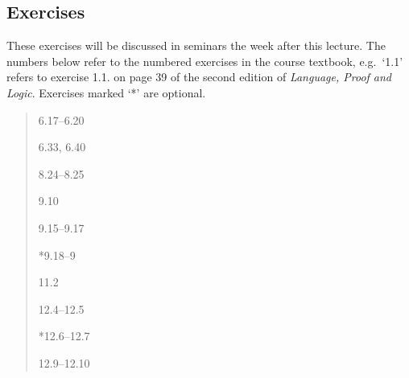 \documentclass[12pt]{extarticle}
\begin{document}
\begin{multicols*}{3}
\begin{minipage}{\columnwidth}
\section{Exercises}
These exercises will be discussed in seminars the week after this lecture.
The numbers below refer to the numbered exercises in the course textbook, e.g.\ `1.1' refers to exercise 1.1. on page 39 of the second edition of \emph{Language, Proof and Logic}. Exercises marked `*' are optional.
 
\begin{quote}
6.17--6.20
 
6.33, 6.40
 
8.24--8.25
 
9.10
 
9.15--9.17
 
*9.18--9
 
11.2
 
12.4--12.5
 
*12.6--12.7
 
12.9--12.10
 
\end{quote}
\end{minipage}


 


\end{multicols*}
\end{document}
